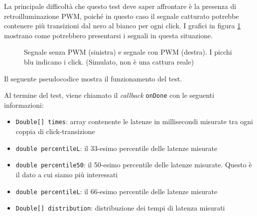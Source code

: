 La principale difficoltà che questo test deve saper affrontare è la presenza di retroilluminazione PWM, poiché in questo caso il segnale catturato potrebbe contenere più transizioni dal nero al bianco per ogni click. I grafici in figura \ref{fig:inputLagTest_example} mostrano come potrebbero presentarsi i segnali in questa situazione.
\begin{figure}[H]
	\centering
	\caption{Segnale senza PWM (sinistra) e segnale con PWM (destra). I picchi blu indicano i click. (Simulato, non è una cattura reale)}
	\label{fig:inputLagTest_example}
\end{figure}

Il seguente pseudocodice mostra il funzionamento del test.


Al termine del test, viene chiamato il \textit{callback} \texttt{onDone} con le seguenti informazioni:\begin{itemize}
	\item \texttt{Double[] times}: array contenente le latenze in millisecondi misurate tra ogni coppia di click-transizione
	\item \texttt{double percentileL}: il 33-esimo percentile delle latenze misurate
	\item \texttt{double percentile50}: il 50-esimo percentile delle latenze misurate. Questo è il dato a cui siamo più interessati
	\item \texttt{double percentileL}: il 66-esimo percentile delle latenze misurate
	\item \texttt{Double[] distribution}: distribuzione dei tempi di latenza misurati
\end{itemize}

